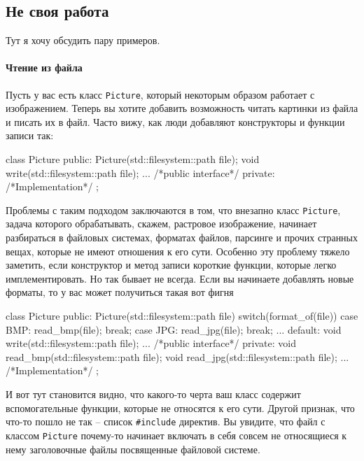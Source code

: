 \subsection{Не своя работа}
\label{section::WrongWork}

Тут я хочу обсудить пару примеров.

\paragraph{Чтение из файла}

Пусть у вас есть класс \verb"Picture", который некоторым образом работает с изображением.
Теперь вы хотите добавить возможность читать картинки из файла и писать их в файл.
Часто вижу, как люди добавляют конструкторы и функции записи так:
\begin{cppcode}
class Picture {
public:
  Picture(std::filesystem::path file);
  void write(std::filesystem::path file);
  ...
  /*public interface*/
private:
  /*Implementation*/
};
\end{cppcode}
Проблемы с таким подходом заключаются в том, что внезапно класс \verb"Picture", задача которого обрабатывать, скажем, растровое изображение, начинает разбираться в файловых системах, форматах файлов, парсинге и прочих странных вещах, которые не имеют отношения к его сути.
Особенно эту проблему тяжело заметить, если конструктор и метод записи короткие функции, которые легко имплементировать.
Но так бывает не всегда.
Если вы начинаете добавлять новые форматы, то у вас может получиться такая вот фигня
\begin{cppcode}
class Picture {
public:
  Picture(std::filesystem::path file) {
    switch(format_of(file)) {
      case BMP:
        read_bmp(file);
        break;
      case JPG:
        read_jpg(file);
        break;
        ...
      default:
    }
  }
  void write(std::filesystem::path file);
  ...
  /*public interface*/
private:
  void read_bmp(std::filesystem::path file);
  void read_jpg(std::filesystem::path file);
  ...
  /*Implementation*/
};
\end{cppcode}
И вот тут становится видно, что какого-то черта ваш класс содержит вспомогательные функции, которые не относятся к его сути.
Другой признак, что что-то пошло не так -- список \verb"#include" директив.
Вы увидите, что файл с классом \verb"Picture" почему-то начинает включать в себя совсем не относящиеся к нему заголовочные файлы посвященные файловой системе.

